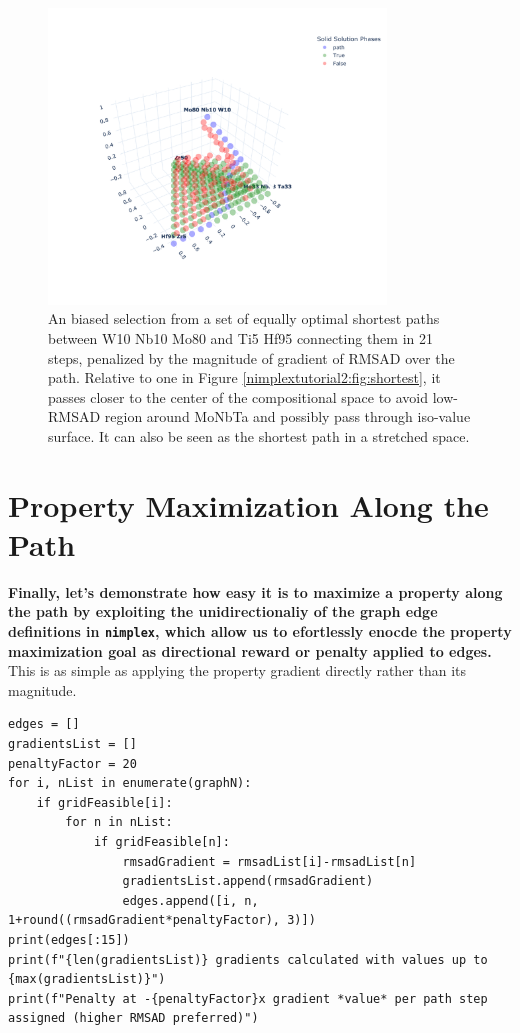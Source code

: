 \begin{figure}[H]
    \centering
    \includegraphics[width=0.8\textwidth]{nimplextutorial2/02.AdditiveManufacturingPathPlanning_65_1.pdf}
    \caption{An biased selection from a set of equally optimal shortest paths between W10 Nb10 Mo80 and Ti5 Hf95 connecting them in 21 steps, penalized by the magnitude of gradient of RMSAD over the path. Relative to one in Figure \ref{nimplextutorial2:fig:shortest}, it passes closer to the center of the compositional space to avoid low-RMSAD region around MoNbTa and possibly pass through iso-value surface. It can also be seen as the shortest path in a stretched space.}
    \label{nimplextutorial2:fig:lowgradient}
\end{figure}


\section{Property Maximization Along the
Path}\label{nimplextutorial2:property-maximization-along-the-path}

\textbf{Finally, let's demonstrate how easy it is to maximize a property
along the path by exploiting the unidirectionaliy of the graph edge
definitions in \texttt{nimplex}, which allow us to
efortlessly enocde the property maximization goal as directional reward
or penalty applied to edges.} This is as simple as applying the property
gradient directly rather than its magnitude.

\begin{verbatim}
edges = []
gradientsList = []
penaltyFactor = 20
for i, nList in enumerate(graphN):
    if gridFeasible[i]:
        for n in nList:
            if gridFeasible[n]:
                rmsadGradient = rmsadList[i]-rmsadList[n]
                gradientsList.append(rmsadGradient)
                edges.append([i, n, 1+round((rmsadGradient*penaltyFactor), 3)])
print(edges[:15])
print(f"{len(gradientsList)} gradients calculated with values up to {max(gradientsList)}")
print(f"Penalty at -{penaltyFactor}x gradient *value* per path step assigned (higher RMSAD preferred)")
\end{verbatim}


